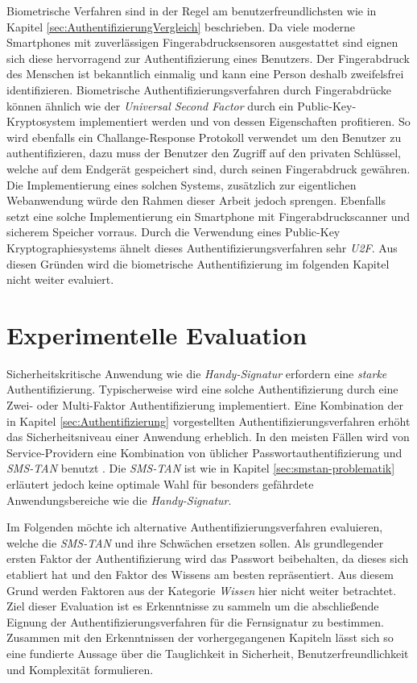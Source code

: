 \documentclass[11pt,a4paper,ngerman]{scrreprt}
\begin{document}
Biometrische Verfahren sind in der Regel am benutzerfreundlichsten wie in Kapitel \ref{sec:AuthentifizierungVergleich} beschrieben. Da viele moderne Smartphones mit zuverlässigen Fingerabdrucksensoren ausgestattet sind eignen sich diese hervorragend zur Authentifizierung eines Benutzers. Der Fingerabdruck des Menschen ist bekanntlich einmalig und kann eine Person deshalb zweifelsfrei identifizieren. Biometrische Authentifizierungsverfahren durch Fingerabdrücke können ähnlich wie der \textit{Universal Second Factor} durch ein Public-Key-Kryptosystem implementiert werden und von dessen Eigenschaften profitieren. So wird ebenfalls ein Challange-Response Protokoll verwendet um den Benutzer zu authentifizieren, dazu muss der Benutzer den Zugriff auf den privaten Schlüssel, welche auf dem Endgerät gespeichert sind, durch seinen Fingerabdruck gewähren. Die Implementierung eines solchen Systems, zusätzlich zur eigentlichen Webanwendung würde den Rahmen dieser Arbeit jedoch sprengen. Ebenfalls setzt eine solche Implementierung ein Smartphone mit Fingerabdruckscanner und sicherem Speicher vorraus. Durch die Verwendung eines Public-Key Kryptographiesystems ähnelt dieses Authentifizierungsverfahren sehr \textit{U2F}. Aus diesen Gründen wird die biometrische Authentifizierung im folgenden Kapitel nicht weiter evaluiert.

\chapter{Experimentelle Evaluation}
Sicherheitskritische Anwendung wie die \textit{Handy-Signatur} erfordern eine \emph{starke} Authentifizierung. Typischerweise wird eine solche Authentifizierung durch eine Zwei- oder Multi-Faktor Authentifizierung implementiert. Eine Kombination der in Kapitel \ref{sec:Authentifizierung} vorgestellten Authentifizierungsverfahren erhöht das Sicherheitsniveau einer Anwendung erheblich. In den meisten Fällen wird von Service-Providern eine Kombination von üblicher Passwortauthentifizierung und \textit{SMS-TAN} benutzt \cite{fido17}. Die \textit{SMS-TAN} ist wie in Kapitel \ref{sec:smstan-problematik} erläutert jedoch keine optimale Wahl für besonders gefährdete Anwendungsbereiche wie die \textit{Handy-Signatur}.

Im Folgenden möchte ich alternative Authentifizierungsverfahren evaluieren, welche die \textit{SMS-TAN} und ihre Schwächen ersetzen sollen. Als grundlegender ersten Faktor der Authentifizierung wird das Passwort beibehalten, da dieses sich etabliert hat und den Faktor des Wissens am besten repräsentiert. Aus diesem Grund werden Faktoren aus der Kategorie \emph{Wissen} hier nicht weiter betrachtet. Ziel dieser Evaluation ist es Erkenntnisse zu sammeln um die abschließende Eignung der Authentifizierungsverfahren für die Fernsignatur zu bestimmen. Zusammen mit den Erkenntnissen der vorhergegangenen Kapiteln lässt sich so eine fundierte Aussage über die Tauglichkeit in Sicherheit, Benutzerfreundlichkeit und Komplexität formulieren.
\end{document}

